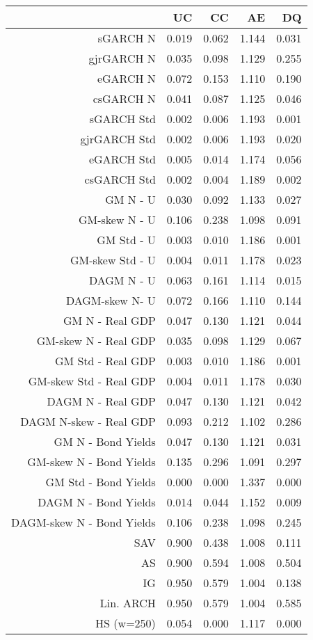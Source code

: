 \documentclass{article}
\begin{document}


\begin{table}[ht]
\centering
\begin{tabular}{rrrrr}
  \hline
 & UC & CC & AE & DQ \\ 
  \hline
sGARCH N & 0.019 & 0.062 & 1.144 & 0.031 \\ 
  gjrGARCH N & 0.035 & 0.098 & 1.129 & 0.255 \\ 
  eGARCH N & 0.072 & 0.153 & 1.110 & 0.190 \\ 
  csGARCH N & 0.041 & 0.087 & 1.125 & 0.046 \\ 
  sGARCH Std & 0.002 & 0.006 & 1.193 & 0.001 \\ 
  gjrGARCH Std & 0.002 & 0.006 & 1.193 & 0.020 \\ 
  eGARCH Std & 0.005 & 0.014 & 1.174 & 0.056 \\ 
  csGARCH Std & 0.002 & 0.004 & 1.189 & 0.002 \\ 
  GM N - U & 0.030 & 0.092 & 1.133 & 0.027 \\ 
  GM-skew N - U & 0.106 & 0.238 & 1.098 & 0.091 \\ 
  GM Std - U & 0.003 & 0.010 & 1.186 & 0.001 \\ 
  GM-skew Std - U & 0.004 & 0.011 & 1.178 & 0.023 \\ 
  DAGM N - U & 0.063 & 0.161 & 1.114 & 0.015 \\ 
  DAGM-skew  N- U & 0.072 & 0.166 & 1.110 & 0.144 \\ 
  GM N - Real GDP & 0.047 & 0.130 & 1.121 & 0.044 \\ 
  GM-skew N - Real GDP & 0.035 & 0.098 & 1.129 & 0.067 \\ 
  GM Std - Real GDP & 0.003 & 0.010 & 1.186 & 0.001 \\ 
  GM-skew Std - Real GDP & 0.004 & 0.011 & 1.178 & 0.030 \\ 
  DAGM N - Real GDP & 0.047 & 0.130 & 1.121 & 0.042 \\ 
  DAGM N-skew - Real GDP & 0.093 & 0.212 & 1.102 & 0.286 \\ 
  GM N - Bond Yields & 0.047 & 0.130 & 1.121 & 0.031 \\ 
  GM-skew N - Bond Yields & 0.135 & 0.296 & 1.091 & 0.297 \\ 
  GM Std - Bond Yields & 0.000 & 0.000 & 1.337 & 0.000 \\ 
  DAGM N - Bond Yields & 0.014 & 0.044 & 1.152 & 0.009 \\ 
  DAGM-skew N - Bond Yields & 0.106 & 0.238 & 1.098 & 0.245 \\ 
  SAV & 0.900 & 0.438 & 1.008 & 0.111 \\ 
  AS & 0.900 & 0.594 & 1.008 & 0.504 \\ 
  IG & 0.950 & 0.579 & 1.004 & 0.138 \\ 
  Lin. ARCH & 0.950 & 0.579 & 1.004 & 0.585 \\ 
  HS (w=250) & 0.054 & 0.000 & 1.117 & 0.000 \\ 
   \hline
\end{tabular}
\end{table}
\end{document}
